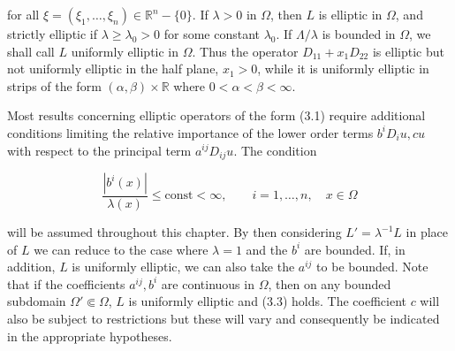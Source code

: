 for all $\xi=(\xi_1,\dots,\xi_n)\in\mathbb{R}^n-\{0\}$. If $\lambda>0$ in $\Omega$, then $L$ is elliptic in $\Omega$, and strictly
elliptic if $\lambda\ge \lambda_0>0$ for some constant $\lambda_0$. If $\Lambda/\lambda$ is bounded in $\Omega$, we shall call $L$
uniformly elliptic in $\Omega$. Thus the operator $D_{11}+x_1D_{22}$ is elliptic but not uniformly
elliptic in the half plane, $x_1>0$, while it is uniformly elliptic in strips of the form
$(\alpha,\beta)\times\mathbb{R}$ where $0<\alpha<\beta<\infty$.

Most results concerning elliptic operators of the form (3.1) require additional
conditions limiting the relative importance of the lower order terms $b^iD_i u, cu$ with
respect to the principal term $a^{ij}D_{ij}u$. The condition

\begin{equation}\tag{3.3}
\frac{|b^i(x)|}{\lambda(x)}\le \mathrm{const}<\infty,\qquad i=1,\dots,n,\quad x\in\Omega
\end{equation}

will be assumed throughout this chapter. By then considering $L'=\lambda^{-1}L$ in place
of $L$ we can reduce to the case where $\lambda=1$ and the $b^i$ are bounded. If, in addition,
$L$ is uniformly elliptic, we can also take the $a^{ij}$ to be bounded. Note that if the
coefficients $a^{ij}, b^i$ are continuous in $\Omega$, then on any bounded subdomain $\Omega'\Subset\Omega$,
$L$ is uniformly elliptic and (3.3) holds. The coefficient $c$ will also be subject to
restrictions but these will vary and consequently be indicated in the appropriate
hypotheses.
